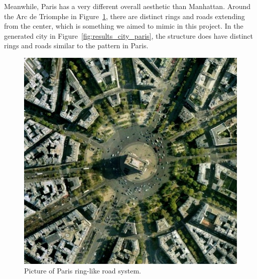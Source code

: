 Meanwhile, Paris has a very different overall aesthetic than Manhattan.
Around the Arc de Triomphe in Figure~\ref{fig:results_real_city_paris}, there are distinct rings and roads extending from the center, which is something we aimed to mimic in this project.
In the generated city in Figure~\ref{fig:results_city_paris}, the structure does have distinct rings and roads similar to the pattern in Paris. 

\begin{figure}[H]
  \centering
  \begin{minipage}{.45\textwidth}
    \centering
    \begin{minipage}{.9\textwidth}
      \centering
      \includegraphics[width=\textwidth]{figure/results/paris_arc_de_triomphe.jpg}
      \caption{Picture of Paris ring-like road system.\cite{paris_city_img}}
      \label{fig:results_real_city_paris}
    \end{minipage}
  \end{minipage}
  \begin{minipage}{.45\textwidth}
    \begin{minipage}{.9\textwidth}
      \centering
      \centering

\end{minipage}
\end{minipage}
\end{figure}
